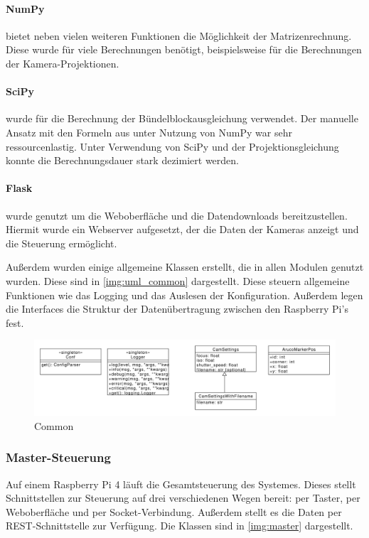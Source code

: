 \documentclass[./00PhotoBox.tex]{subfiles}
\begin{document}
\paragraph{NumPy}
bietet neben vielen weiteren Funktionen die Möglichkeit der Matrizenrechnung. Diese wurde für viele Berechnungen benötigt, beispielsweise für die Berechnungen der Kamera-Projektionen.

\paragraph{SciPy}
wurde für die Berechnung der Bündelblockausgleichung verwendet. Der manuelle Ansatz mit den Formeln aus \cite{luhmann} unter Nutzung von NumPy war sehr ressourcenlastig. Unter Verwendung von SciPy und der Projektionsgleichung konnte die Berechnungsdauer stark dezimiert werden.

\paragraph{Flask}
wurde genutzt um die Weboberfläche und die Datendownloads bereitzustellen. Hiermit wurde ein Webserver aufgesetzt, der die Daten der Kameras anzeigt und die Steuerung ermöglicht.

Außerdem wurden einige allgemeine Klassen erstellt, die in allen Modulen genutzt wurden. Diese sind in \autoref{img:uml_common} dargestellt. Diese steuern allgemeine Funktionen wie das Logging und das Auslesen der Konfiguration. Außerdem legen die Interfaces die Struktur der Datenübertragung zwischen den Raspberry Pi's fest.

\begin{figure}
    \centering
    \includegraphics[width=1\textwidth]{./img/uml/uml_common_classdiagramm.pdf}
    \caption{Common} %
    \label{img:uml_common} %
\end{figure}


\subsubsection{Master-Steuerung}

Auf einem Raspberry Pi 4 läuft die Gesamtsteuerung des Systemes. Dieses stellt Schnittstellen zur Steuerung auf drei verschiedenen Wegen bereit: per Taster, per Weboberfläche und per Socket-Verbindung. Außerdem stellt es die Daten per REST-Schnittstelle zur Verfügung. Die Klassen sind in \autoref{img:master} dargestellt.
\end{document}

